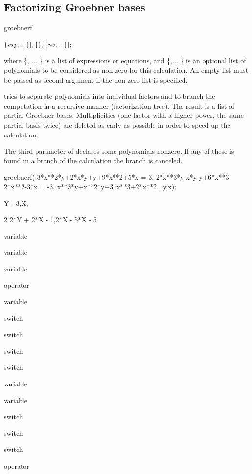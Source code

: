 \subsection{Factorizing Groebner bases}

\begin{Operator}{groebnerf}
\begin{Syntax}

\(\{\meta{exp}, ...\}[,\{\},\{\meta{nz}, ... \}]\);

\end{Syntax}
where \{, ... \} is a list of expressions or
equations, and \{,... \} is
an optional list of polynomials to be considered as non zero
for this calculation. An empty list must be passed as second argument
if the non-zero list is specified.


 tries to separate polynomials into individual factors and
to branch the computation in a recursive manner (factorization tree).
The result is a list of partial Groebner bases. 
Multiplicities (one factor with a higher power, the same partial basis
twice) are deleted as early as possible in order to speed up the
calculation. 

The third parameter of  declares some polynomials
nonzero. If any of these is found in a branch of the calculation
the branch is canceled. 

\begin{Bigexample}
groebnerf({ 3*x**2*y+2*x*y+y+9*x**2+5*x = 3,  
            2*x**3*y-x*y-y+6*x**3-2*x**2-3*x = -3, 
            x**3*y+x**2*y+3*x**3+2*x**2 }, {y,x});

       {{Y - 3,X},

                      2
    {2*Y + 2*X - 1,2*X  - 5*X - 5}}
\end{Bigexample}

\begin{Related}
\item[ \nameref{groebresmax} variable]
\item[ \nameref{groebmonfac} variable]
\item[ \nameref{groebrestriction} variable]
\item[ \nameref{groebner} operator]
\item[ \nameref{gvarslast} variable]
\item[ \nameref{groebopt} switch]
\item[ \nameref{groebprereduce} switch]
\item[ \nameref{groebfullreduction} switch]
\item[ \nameref{gltbasis} switch]
\item[ \nameref{gltb} variable]
\item[ \nameref{glterms} variable]
\item[ \nameref{groebstat} switch]
\item[ \nameref{trgroeb} switch]
\item[ \nameref{trgroebs} switch]
\item[ \nameref{groebnert} operator]
\end{Related}


\end{Operator}
